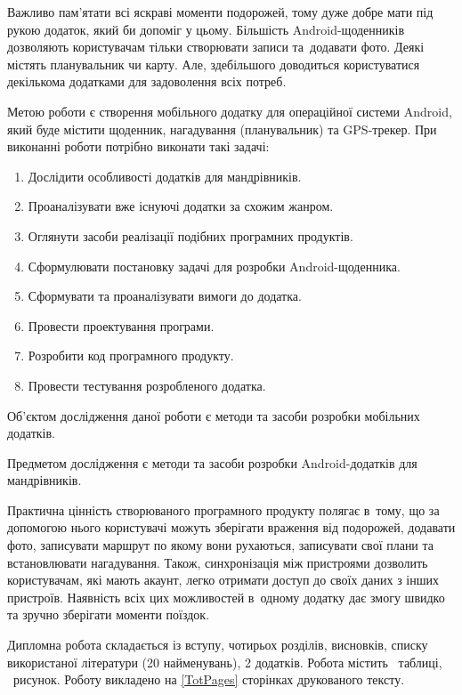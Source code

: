 \documentclass[../main.tex]{subfiles}
\begin{document}
Важливо пам'ятати всі яскраві моменти подорожей, тому дуже добре мати під рукою додаток, який би допоміг у цьому. Більшість Android-щоденників дозволяють користувачам тільки створювати записи та~додавати фото. Деякі містять планувальник чи карту. Але, здебільшого доводиться користуватися декількома додатками для задоволення всіх потреб.

Метою роботи є створення мобільного додатку для операційної системи Android, який буде містити щоденник, нагадування (планувальник) та \mbox{GPS-трекер}.
При виконанні роботи потрібно виконати такі задачі:
\begin{enumerate}
\item Дослідити особливості додатків для мандрівників.
\item Проаналізувати вже існуючі додатки за схожим жанром.
\item Оглянути засоби реалізації подібних програмних продуктів.
\item Сформулювати постановку задачі для розробки Android-щоденника.
\item Сформувати та проаналізувати вимоги до додатка.
\item Провести проектування програми.
\item Розробити код програмного продукту.
\item Провести тестування розробленого додатка.
\end{enumerate}

Об'єктом дослідження даної роботи є методи та засоби розробки мобільних додатків. 

Предметом дослідження є методи та засоби розробки Android-додатків для мандрівників.

Практична цінність створюваного програмного продукту полягає в~тому, що за допомогою нього користувачі можуть зберігати враження від подорожей, додавати фото, записувати маршрут по якому вони рухаються, записувати свої плани та встановлювати нагадування. Також, синхронізація між пристроями дозволить користувачам, які мають акаунт, легко отримати доступ до своїх даних з інших пристроїв. Наявність всіх цих можливостей в~одному додатку дає змогу швидко та зручно зберігати моменти поїздок.

Дипломна робота складається із вступу, чотирьох розділів, висновків, списку використаної літератури (20 найменувань), 2 додатків. Робота містить \totaltables\ таблиці, \totalfigures\ рисунок. Роботу викладено на \ref{TotPages} сторінках друкованого тексту. 
\end{document}

